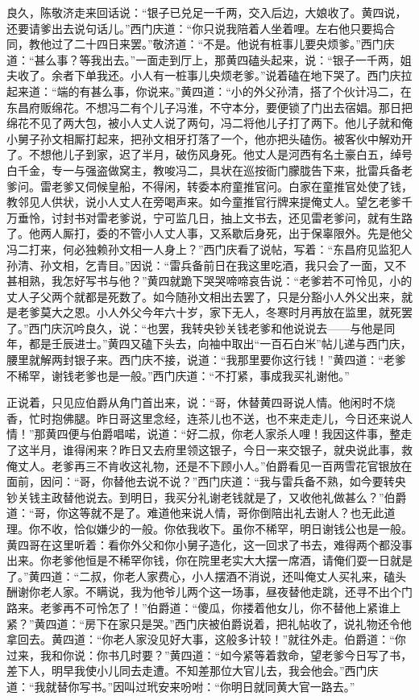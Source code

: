 良久，陈敬济走来回话说：“银子已兑足一千两，交入后边，大娘收了。黄四说，还要请爹出去说句话儿。”西门庆道：“你只说我陪着人坐着哩。左右他只要捣合同，教他过了二十四日来罢。”敬济道：“不是。他说有桩事儿要央烦爹。”西门庆道：“甚么事？等我出去。”一面走到厅上，那黄四磕头起来，说：“银子一千两，姐夫收了。余者下单我还。小人有一桩事儿央烦老爹。”说着磕在地下哭了。西门庆拉起来道：“端的有甚么事，你说来。”黄四道：“小的外父孙清，搭了个伙计冯二，在东昌府贩绵花。不想冯二有个儿子冯淮，不守本分，要便锁了门出去宿娼。那日把绵花不见了两大包，被小人丈人说了两句，冯二将他儿子打了两下。他儿子就和俺小舅子孙文相厮打起来，把孙文相牙打落了一个，他亦把头磕伤。被客伙中解劝开了。不想他儿子到家，迟了半月，破伤风身死。他丈人是河西有名土豪白五，绰号白千金，专一与强盗做窝主，教唆冯二，具状在巡按衙门朦胧告下来，批雷兵备老爹问。雷老爹又伺候皇船，不得闲，转委本府童推官问。白家在童推官处使了钱，教邻见人供状，说小人丈人在旁喝声来。如今童推官行牌来提俺丈人。望乞老爹千万垂怜，讨封书对雷老爹说，宁可监几日，抽上文书去，还见雷老爹问，就有生路了。他两人厮打，委的不管小人丈人事，又系歇后身死，出于保辜限外。先是他父冯二打来，何必独赖孙文相一人身上？”西门庆看了说帖，写着：“东昌府见监犯人孙清、孙文相，乞青目。”因说：“雷兵备前日在我这里吃酒，我只会了一面，又不甚相熟，我怎好写书与他？”黄四就跪下哭哭啼啼哀告说：“老爹若不可怜见，小的丈人子父两个就都是死数了。如今随孙文相出去罢了，只是分豁小人外父出来，就是老爹莫大之恩。小人外父今年六十岁，家下无人，冬寒时月再放在监里，就死罢了。”西门庆沉吟良久，说：“也罢，我转央钞关钱老爹和他说说去——与他是同年，都是壬辰进士。”黄四又磕下头去，向袖中取出“一百石白米”帖儿递与西门庆，腰里就解两封银子来。西门庆不接，说道：“我那里要你这行钱！”黄四道：“老爹不稀罕，谢钱老爹也是一般。”西门庆道：“不打紧，事成我买礼谢他。”

正说着，只见应伯爵从角门首出来，说：“哥，休替黄四哥说人情。他闲时不烧香，忙时抱佛腿。昨日哥这里念经，连茶儿也不送，也不来走走儿，今日还来说人情！”那黄四便与伯爵唱喏，说道：“好二叔，你老人家杀人哩！我因这件事，整走了这半月，谁得闲来？昨日又去府里领这银子，今日一来交银子，就央说此事，救俺丈人。老爹再三不肯收这礼物，还是不下顾小人。”伯爵看见一百两雪花官银放在面前，因问：“哥，你替他去说不说？”西门庆道：“我与雷兵备不熟，如今要转央钞关钱主政替他说去。到明日，我买分礼谢老钱就是了，又收他礼做甚么？”伯爵道：“哥，你这等就不是了。难道他来说人情，哥你倒陪出礼去谢人？也无此道理。你不收，恰似嫌少的一般。你依我收下。虽你不稀罕，明日谢钱公也是一般。黄四哥在这里听着：看你外父和你小舅子造化，这一回求了书去，难得两个都没事出来。你老爹他恒是不稀罕你钱，你在院里老实大大摆一席酒，请俺们耍一日就是了。”黄四道：“二叔，你老人家费心，小人摆酒不消说，还叫俺丈人买礼来，磕头酬谢你老人家。不瞒说，我为他爷儿两个这一场事，昼夜替他走跳，还寻不出个门路来。老爹再不可怜怎了！”伯爵道：“傻瓜，你搂着他女儿，你不替他上紧谁上紧？”黄四道：“房下在家只是哭。”西门庆被伯爵说着，把礼帖收了，说礼物还令他拿回去。黄四道：“你老人家没见好大事，这般多计较！”就往外走。伯爵道：“你过来，我和你说：你书几时要？”黄四道：“如今紧等着救命，望老爹今日写了书，差下人，明早我使小儿同去走遭。不知差那位大官儿去，我会他会。”西门庆道：“我就替你写书。”因叫过玳安来吩咐：“你明日就同黄大官一路去。”

